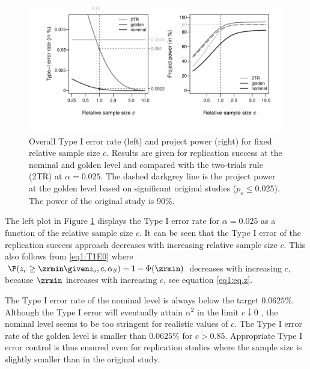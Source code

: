 \begin{figure}[!h]
\centering

\begin{knitrout}
\color{fgcolor}

{\centering \includegraphics[width=\maxwidth]{images/paper1/fig4-1}

}

\end{knitrout}

\caption{Overall Type I error rate (left) and project power (right) for fixed
  relative sample size $c$. Results are given for replication success at the
  nominal and golden level and compared with the two-trials rule (2TR) at
  $\alpha = 0.025$. The dashed darkgrey line is the project power at the golden
  level based on significant original studies ($p_o \leq 0.025$). The power of
  the original study is 90\%.}
\label{fig1:fig4}
\end{figure}


The left plot in Figure \ref{fig1:fig4} displays the Type I error rate for
$\alpha=0.025$ as a function of the relative sample size $c$. It can be seen
that the Type I error of the replication success approach decreases with
increasing relative sample size $c$. This also follows from \eqref{eq1:T1E0}
where $\P(z_r \geq \zrmin \given z_o, c, \alpha_S) = 1 - \Phi(\zrmin)$ decreases
with increasing $c$, because $\zrmin$ increases with increasing $c$, see
equation \eqref{eq1:eq.z}.


The Type I error rate of the nominal level is always below the target
$0.0625$\%. Although the Type I error will eventually attain $\alpha^2$ in the
limit $c \downarrow 0$ \citep[Section 3.4]{Held2020}, the nominal level seems to
be too stringent for realistic values of $c$. The Type I error rate of the
golden level is smaller than $0.0625$\% for $c >0.85$. Appropriate Type I error
control is thus ensured even for replication studies where the sample size is
slightly smaller than in the original study.

